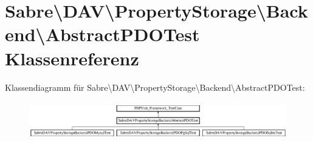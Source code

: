 \hypertarget{class_sabre_1_1_d_a_v_1_1_property_storage_1_1_backend_1_1_abstract_p_d_o_test}{}\section{Sabre\textbackslash{}D\+AV\textbackslash{}Property\+Storage\textbackslash{}Backend\textbackslash{}Abstract\+P\+D\+O\+Test Klassenreferenz}
\label{class_sabre_1_1_d_a_v_1_1_property_storage_1_1_backend_1_1_abstract_p_d_o_test}
Klassendiagramm für Sabre\textbackslash{}D\+AV\textbackslash{}Property\+Storage\textbackslash{}Backend\textbackslash{}Abstract\+P\+D\+O\+Test\+:\begin{figure}[H]
\begin{center}
\leavevmode
\includegraphics[height=1.666667cm]{class_sabre_1_1_d_a_v_1_1_property_storage_1_1_backend_1_1_abstract_p_d_o_test}
\end{center}
\end{figure}
